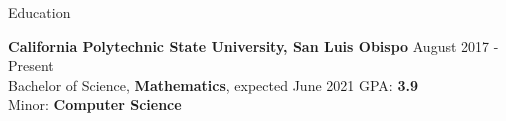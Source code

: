 \documentclass{resume} %
\begin{document}

\begin{rSection}{Education}

{\bf California Polytechnic State University, San Luis Obispo} \hfill {August 2017 - Present} 
\\ Bachelor of Science, \textbf{Mathematics}, expected June 2021 \hfill {GPA: \textbf{3.9}}
\\ Minor: \textbf{Computer Science}

\end{rSection}

\end{document}
